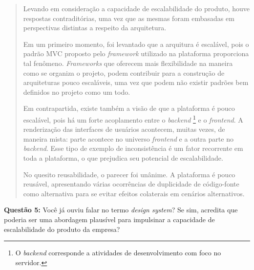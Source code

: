 \begin{quote}
    Levando em consideração a capacidade de escalabilidade do produto, houve respostas contraditórias, uma vez que as mesmas foram embasadas em perspectivas distintas a respeito da arquitetura.
    
    Em um primeiro momento, foi levantado que a arquitura é escalável, pois o padrão MVC proposto pelo \textit{framework} utilizado na plataforma proporciona tal fenômeno. \textit{Frameworks} que oferecem mais flexibilidade na maneira como se organiza o projeto, podem contribuir para a construção de arquiteturas pouco escaláveis, uma vez que podem não existir padrões bem definidos no projeto como um todo.
    
    Em contrapartida, existe também a visão de que a plataforma é pouco escalável, pois há um forte acoplamento entre o \textit{backend} \footnote{O \textit{backend} corresponde a atividades de desenvolvimento com foco no servidor.} e o \textit{frontend}. A renderização das interfaces de usuários acontecem, muitas vezes, de maneira mista: parte acontece no universo \textit{frontend} e a outra parte no \textit{backend}. Esse tipo de exemplo de inconsistência é um fator recorrente em toda a plataforma, o que prejudica seu potencial de escalabilidade.
    
    No quesito reusabilidade, o parecer foi unânime. A plataforma é pouco reusável, apresentando várias ocorrências de duplicidade de código-fonte como alternativa para se evitar efeitos colaterais em cenários alternativos.
\end{quote}

\textbf{Questão 5:} Você já ouviu falar no termo \textit{design system}? Se sim, acredita que poderia ser uma abordagem plausível para impulsinar a capacidade de escalabilidade do produto da empresa?


